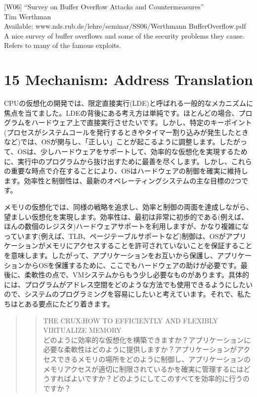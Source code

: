 {[}W06{]} ``Survey on Buffer Overflow Attacks and Countermeasures''\\
Tim Werthman\\
Available: www.nds.rub.de/lehre/seminar/SS06/Werthmann
BufferOverflow.pdf\\
A nice survey of buffer overflows and some of the security problems they
cause. Refers to many of the famous exploits.

\newpage

\hypertarget{mechanism-address-translation}{%
\section*{15 Mechanism: Address
Translation}\label{mechanism-address-translation}}

CPUの仮想化の開発では、限定直接実行(LDE)と呼ばれる一般的なメカニズムに焦点を当てました。LDEの背後にある考え方は単純です。ほとんどの場合、プログラムをハードウェア上で直接実行させたいです。しかし、特定のキーポイント(プロセスがシステムコールを発行するときやタイマー割り込みが発生したときなど)では、OSが関与し、「正しい」ことが起こるように調整します。したがって、OSは、少しハードウェアをサポートして、効率的な仮想化を実現するために、実行中のプログラムから抜け出すために最善を尽くします。しかし、これらの重要な時点で介在することにより、OSはハードウェアの制御を確実に維持します。効率性と制御性は、最新のオペレーティングシステムの主な目標の2つです。

メモリの仮想化では、同様の戦略を追求し、効率と制御の両面を達成しながら、望ましい仮想化を実現します。効率性は、最初は非常に初歩的である(例えば、ほんの数個のレジスタ)ハードウェアサポートを利用しますが、かなり複雑になっています(例えば、TLB、ページテーブルサポートなど)制御は、OSがアプリケーションがメモリにアクセスすることを許可されていないことを保証することを意味します。したがって、アプリケーションをお互いから保護し、アプリケーションからOSを保護するために、ここでもハードウェアの助けが必要です。最後に、柔軟性の点で、VMシステムからもう少し必要なものがあります。具体的には、プログラムがアドレス空間をどのような方法でも使用できるようにしたいので、システムのプログラミングを容易にしたいと考えています。それで、私たちはとある要点にたどり着きます。

\begin{quote}
\begin{quote}
THE CRUX:HOW TO EFFICIENTLY AND FLEXIBLY VIRTUALIZE MEMORY\\
どのように効率的な仮想化を構築できますか？アプリケーションに必要な柔軟性はどのように提供しますか？アプリケーションがアクセスできるメモリの場所をどのように制御し、アプリケーションのメモリアクセスが適切に制限されているかを確実に管理するにはどうすればよいですか？どのようにしてこのすべてを効率的に行うのですか？
\end{quote}
\end{quote}

